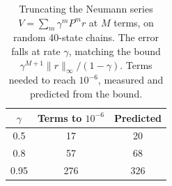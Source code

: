 \begin{table}[h]
\centering
\caption{Truncating the Neumann series $V = \sum_m \gamma^m P^m r$ at $M$ terms, on random 40-state chains. The error falls at rate $\gamma$, matching the bound $\gamma^{M+1}\|r\|_\infty/(1-\gamma)$. Terms needed to reach $10^{-6}$, measured and predicted from the bound.}
\label{tab:prelim_neumann}
\begin{tabular}{ccc}
\hline
$\gamma$ & Terms to $10^{-6}$ & Predicted \\
\hline
0.5 & 17 & 20 \\
0.8 & 57 & 68 \\
0.95 & 276 & 326 \\
\hline
\end{tabular}
\end{table}
